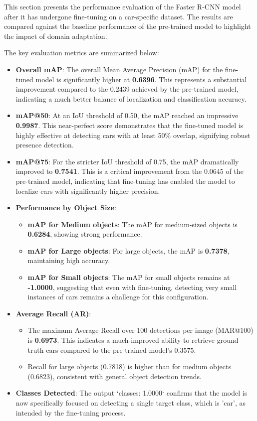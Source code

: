 \documentclass[12pt,a4paper]{article}
\begin{document}
This section presents the performance evaluation of the Faster R-CNN model after it has undergone fine-tuning on a car-specific dataset. The results are compared against the baseline performance of the pre-trained model to highlight the impact of domain adaptation.

The key evaluation metrics are summarized below:

\begin{itemize}
    \item \textbf{Overall mAP}: The overall Mean Average Precision (mAP) for the fine-tuned model is significantly higher at \textbf{0.6396}. This represents a substantial improvement compared to the 0.2439 achieved by the pre-trained model, indicating a much better balance of localization and classification accuracy.
    \item \textbf{mAP@50}: At an IoU threshold of 0.50, the mAP reached an impressive \textbf{0.9987}. This near-perfect score demonstrates that the fine-tuned model is highly effective at detecting cars with at least 50\% overlap, signifying robust presence detection.
    \item \textbf{mAP@75}: For the stricter IoU threshold of 0.75, the mAP dramatically improved to \textbf{0.7541}. This is a critical improvement from the 0.0645 of the pre-trained model, indicating that fine-tuning has enabled the model to localize cars with significantly higher precision.
    \item \textbf{Performance by Object Size}:
    \begin{itemize}
        \item \textbf{mAP for Medium objects}: The mAP for medium-sized objects is \textbf{0.6284}, showing strong performance.
        \item \textbf{mAP for Large objects}: For large objects, the mAP is \textbf{0.7378}, maintaining high accuracy.
        \item \textbf{mAP for Small objects}: The mAP for small objects remains at \textbf{-1.0000}, suggesting that even with fine-tuning, detecting very small instances of cars remains a challenge for this configuration.
    \end{itemize}
    \item \textbf{Average Recall (AR)}:
    \begin{itemize}
        \item The maximum Average Recall over 100 detections per image (MAR@100) is \textbf{0.6973}. This indicates a much-improved ability to retrieve ground truth cars compared to the pre-trained model's 0.3575.
        \item Recall for large objects (0.7818) is higher than for medium objects (0.6823), consistent with general object detection trends.
    \end{itemize}
    \item \textbf{Classes Detected}: The output `classes: 1.0000` confirms that the model is now specifically focused on detecting a single target class, which is 'car', as intended by the fine-tuning process.
\end{itemize}
\end{document}

